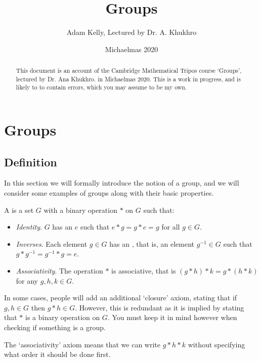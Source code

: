 \documentclass[a4]{scrartcl}
\title{Groups}
\author{Adam Kelly, Lectured by Dr. A. Khukhro}
\date{Michaelmas 2020}
\begin{document}
\maketitle

\begin{abstract}
	This document is an account of the Cambridge Mathematical Tripos course `Groups', lectured by Dr. Ana Khukhro. in Michaelmas 2020.
	This is a work in progress, and is likely to to contain errors, which you may assume to be my own.
\end{abstract}

\tableofcontents

\clearpage

\section{Groups}

\subsection{Definition}

In this section we will formally introduce the notion of a group, and we will consider some examples of groups along with their basic properties.

\begin{definition}
	A  is a set $G$ with a binary operation $*$ on $G$ such that:
	\begin{itemize}
		\item \emph{Identity}. $G$ has an  $e$ such that $e * g = g * e = g$ for all $g \in G$.
		\item \emph{Inverses}. Each element $g \in G$ has an , that is, an element $g^{-1} \in G$ such that $g * g^{-1} = g^{-1} * g = e$.
		\item \emph{Associativity}. The operation $*$ is associative, that is $(g * h) * k = g * (h * k)$ for any $g, h, k \in G$. 
	\end{itemize}
\end{definition}

\begin{remark}
	In some cases, people will add an additional `closure' axiom, stating that if $g, h \in G$ then $g * h \in G$. However, this is redundant as it is implied by stating that $*$ is a binary operation on $G$. You must keep it in mind however when checking if something is a group.
\end{remark}
\begin{remark}[Bracketing]
	The `associativity' axiom means that we can write $g * h * k$ without specifying what order it should be done first.
\end{remark}
\end{document}
